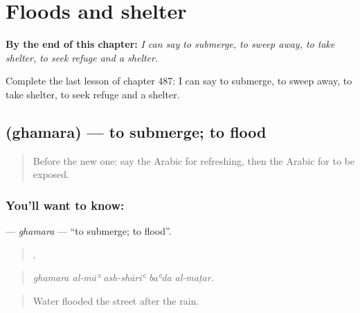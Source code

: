 
\chapter{Floods and shelter}
\label{ch:ar-floods-and-shelter}

\begin{chapteropening}
\textbf{By the end of this chapter:} \emph{I can say to submerge, to sweep away, to take shelter, to seek refuge and a shelter.}

Complete the last lesson of chapter 487: I can say to submerge, to sweep away, to take shelter, to seek refuge and a shelter.
\end{chapteropening}

\section[\texorpdfstring{\ar{غمر} (ghamara)}{غمر (ghamara)}]{ (ghamara) — to submerge; to flood}

\label{lesson:AR-C487-ghamara}



\begin{quote}
Before the new one: say the Arabic for refreshing, then the Arabic for to be exposed.
\end{quote}

\subsection*{You'll want to know: }
\textbf{} — \emph{ghamara} — \textquotedblleft{}to submerge; to flood\textquotedblright{}.

\begin{quote}
    .
\end{quote}

\begin{quote}
\emph{ghamara al-māʾ ash-shāriʿ baʿda al-maṭar.}
\end{quote}

\begin{quote}
Water flooded the street after the rain.
\end{quote}

